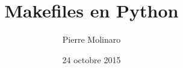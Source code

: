 \documentclass[a4paper,11pt]{extarticle}
\begin{document}
 


\title{\Huge{\textbf{Makefiles en Python}}}
\author{Pierre Molinaro}
\date {24 octobre 2015}

\maketitle


\tableofcontents

\end{document}
